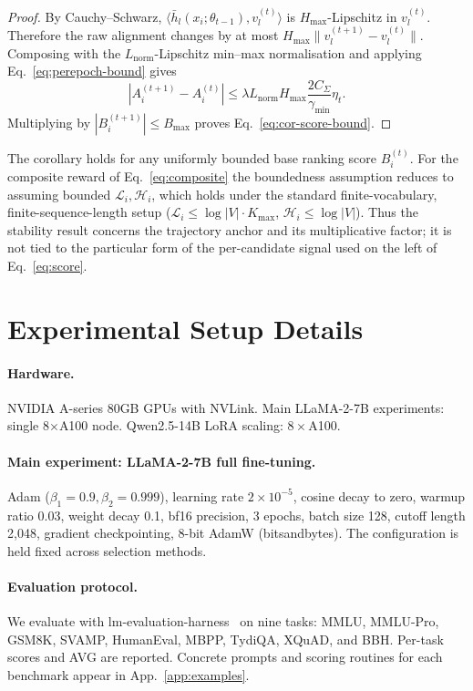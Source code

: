 \begin{proof}
By Cauchy--Schwarz,
$\langle \bar h_l(x_i;\theta_{t-1}),v_l^{(t)}\rangle$ is
$H_{\max}$-Lipschitz in $v_l^{(t)}$. Therefore the raw alignment
changes by at most
$H_{\max}\|v_l^{(t+1)}-v_l^{(t)}\|$. Composing with the
$L_{\mathrm{norm}}$-Lipschitz min--max normalisation and applying
Eq.~\ref{eq:perepoch-bound} gives
\[
|A_i^{(t+1)}-A_i^{(t)}|
\le
\lambda L_{\mathrm{norm}}H_{\max}
\frac{2C_\Sigma}{\gamma_{\min}}\eta_t .
\]
Multiplying by $|B_i^{(t+1)}|\le B_{\max}$ proves
Eq.~\ref{eq:cor-score-bound}.
\end{proof}

The corollary holds for any uniformly bounded base ranking score
$B_i^{(t)}$. For the composite reward of Eq.~\ref{eq:composite}
the boundedness assumption reduces to assuming bounded
$\mathcal{L}_i, \mathcal{H}_i$, which holds under the standard
finite-vocabulary, finite-sequence-length setup
($\mathcal{L}_i \le \log|V|\cdot K_{\max}$,
$\mathcal{H}_i \le \log|V|$). Thus the stability result concerns
the trajectory anchor and its multiplicative factor; it is not
tied to the particular form of the per-candidate signal used on
the left of Eq.~\ref{eq:score}.

\section{Experimental Setup Details}
\label{app:setup-details}

\paragraph{Hardware.}
NVIDIA A-series 80GB GPUs with NVLink. Main LLaMA-2-7B experiments:
single 8$\times$A100 node. Qwen2.5-14B LoRA scaling: $8\times$A100.

\paragraph{Main experiment: LLaMA-2-7B full fine-tuning.}
Adam ($\beta_1=0.9, \beta_2=0.999$), learning rate $2\times10^{-5}$,
cosine decay to zero, warmup ratio 0.03, weight decay 0.1, bf16
precision, 3 epochs, batch size 128, cutoff length 2{,}048,
gradient checkpointing, 8-bit AdamW (bitsandbytes). The
configuration is held fixed across selection methods.

\paragraph{Evaluation protocol.}
We evaluate with lm-evaluation-harness~\cite{eval-harness} on nine
tasks: MMLU, MMLU-Pro, GSM8K, SVAMP, HumanEval, MBPP, TydiQA,
XQuAD, and BBH. Per-task scores and AVG are reported. Concrete
prompts and scoring routines for each benchmark appear in
App.~\ref{app:examples}.

